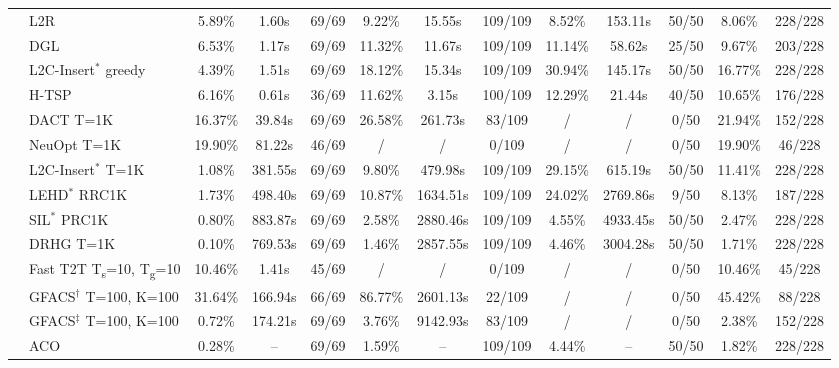 \begin{table}[htbp]
\begin{threeparttable}
\begin{tabular}{c|l|ccc|ccc|ccc|cc}
          & L2R   & 5.89\% & 1.60s & 69/69 & 9.22\% & 15.55s & 109/109 & 8.52\% & 153.11s & 50/50 &  {{8.06\%}} &  {{228}/228}   \\
          & DGL   & 6.53\% & 1.17s & 69/69 & 11.32\% & 11.67s & 109/109 & 11.14\% & 58.62s & 25/50 & 9.67\% & 203/228 \\
          & L2C-Insert$^*$ greedy & 4.39\% & 1.51s & 69/69 & 18.12\% & 15.34s & 109/109 & 30.94\% & 145.17s & 50/50 & 16.77\% &  {{228}/228}   \\
\cmidrule{2-13}          & H-TSP & 6.16\% &  {{0.61s}} & 36/69 & 11.62\% &  {{3.15s}} & 100/109 & 12.29\% &  {{21.44s}} & 40/50 & 10.65\% & 176/228 \\
\cmidrule{2-13}          & DACT T=1K & 16.37\% & 39.84s & 69/69 & 26.58\% & 261.73s & 83/109 & /     & /     & 0/50  & 21.94\% & 152/228 \\
          & NeuOpt T=1K & 19.90\% & 81.22s & 46/69 & /     & /     & 0/109 & /     & /     & 0/50  & 19.90\% & 46/228 \\
\cmidrule{2-13}          & L2C-Insert$^*$ T=1K & 1.08\% & 381.55s & 69/69 & 9.80\% & 479.98s & 109/109 & 29.15\% & 615.19s & 50/50 & 11.41\% &  {{228}/228}   \\
          & LEHD$^*$ RRC1K & 1.73\% & 498.40s & 69/69 & 10.87\% & 1634.51s & 109/109 & 24.02\% & 2769.86s & 9/50  & 8.13\% & 187/228 \\
          & SIL$^*$ PRC1K & 0.80\% & 883.87s & 69/69 & 2.58\% & 2880.46s & 109/109 & 4.55\% & 4933.45s & 50/50 & 2.47\% &  {{228}/228} \\
          & DRHG T=1K & 0.10\% & 769.53s & 69/69 & 1.46\% & 2857.55s & 109/109 & 4.46\% & 3004.28s & 50/50 &  {{1.71\%}} &  {{228}/228}   \\
          & Fast T2T T\textsubscript{s}=10, T\textsubscript{g}=10 & 10.46\% & 1.41s & 45/69 & /     & /     & 0/109 & /     & /     & 0/50  & 10.46\% & 45/228 \\
\cmidrule{2-13}          & GFACS$^{\dagger}$ T=100, K=100 & 31.64\% & 166.94s & 66/69 & 86.77\% & 2601.13s & 22/109 & /     & /     & 0/50  & 45.42\% & 88/228 \\
          & GFACS$^{\ddagger}$ T=100, K=100 & 0.72\% & 174.21s & 69/69 & 3.76\% & 9142.93s & 83/109 & /     & /     & 0/50  & 2.38\% & 152/228 \\
    \midrule

\cmidrule{2-13}
          & ACO
          & 0.28\% & -- & 69/69
          & 1.59\% & -- & 109/109
          & 4.44\% & -- & 50/50
          & 1.82\% & 228/228 \\


\end{tabular}
\end{threeparttable}
\end{table}
